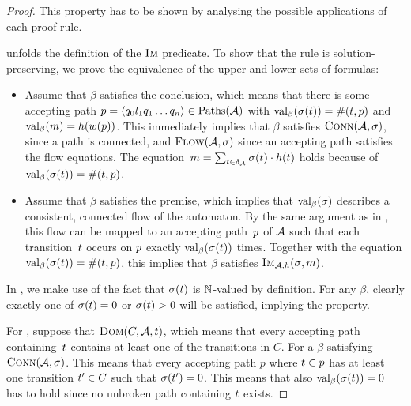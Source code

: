 \begin{proof}
  This property has to be shown by analysing the possible applications
  of each proof rule.

  \Expand{} unfolds the definition of the $\operatorname{\textsc{Im}}$ predicate. To show
  that the rule is solution-preserving, we prove the equivalence of the
  upper and lower sets of formulas:
  \begin{itemize}
  \item Assume that $\beta$ satisfies the conclusion, which means that
    there is some accepting path
    $p = \left\langle q_0 l_1 q_1 \ldots q_n\right\rangle \in \operatorname{Paths}(\mathcal{A})$ with
    $\operatorname{val}_\beta(\operatorname{\sigma}(t)) = \operatorname{\#}(t,
    p)$ and $\operatorname{val}_\beta(m) =
    h(w(p))$. This immediately implies that $\beta$
    satisfies $\operatorname{\textsc{Conn}}(\mathcal{A}, \operatorname{\sigma})$, since a path is
    connected, and $\textsc{Flow}(\mathcal{A}, \operatorname{\sigma})$ since an accepting
    path satisfies the flow equations. The
    equation~$m = \sum_{t \in
      \delta_{\mathcal{A}}}\operatorname{\sigma}(t) \cdot
    h(t)$ holds because of
    $\operatorname{val}_\beta(\operatorname{\sigma}(t)) = \operatorname{\#}(t,
    p)$.
  \item Assume that $\beta$ satisfies the premise, which implies that
    $\operatorname{val}_\beta(\operatorname{\sigma})$ describes a consistent, connected flow of
    the automaton. By the same argument as in
    \cite{generate-parikh-image}, this flow
    can be mapped to an accepting path~$p$ of $\mathcal{A}$ such
    that each transition~$t$ occurs on $p$ exactly
    $\operatorname{val}_\beta(\operatorname{\sigma}(t))$ times. Together with the equation
    $\operatorname{val}_\beta(\operatorname{\sigma}(t)) = \operatorname{\#}(t,
    p)$, this implies that $\beta$ satisfies $\operatorname{\textsc{Im}}_{\mathcal{A}, h}(\operatorname{\sigma}, m)$.
  \end{itemize}

  In \Split{}, we make use of the fact that $\operatorname{\sigma}(t)$ is
  $\mathbb{N}$-valued by definition. For any $\beta$, clearly exactly
  one of $\operatorname{\sigma}(t) = 0$ or $\operatorname{\sigma}(t) > 0$ will
  be satisfied, implying the property.

  For \Propagate{}, suppose that $\operatorname{\textsc{Dom}}(C, \mathcal{A}, t)$, which
  means that every accepting path containing~$t$ contains at least one
  of the transitions in $C$. For a $\beta$ satisfying $\operatorname{\textsc{Conn}}(\mathcal{A},
  \operatorname{\sigma})$. This means that every accepting path $p$ where $t \in p$
  has at least one transition $t' \in C$ such that
  $\operatorname{\sigma}(t') = 0$. This means that also
  $\operatorname{val}_\beta(\operatorname{\sigma}(t)) = 0$ has to hold since no unbroken path
  containing $t$ exists.


\end{proof}
